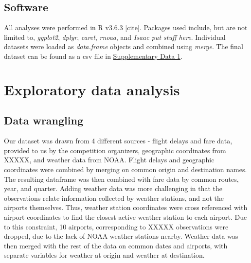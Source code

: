 \documentclass[12pt, a4paper]{book}
\newcommand\tab[1][1cm]{\hspace*{#1}}
\begin{document}
	\section{Software}
	\tab All analyses were performed in R v3.6.3 [cite]. Packages used include, but are not limited to, \textit{ggplot2}, \textit{dplyr}, \textit{caret}, \textit{rnoaa}, and \textit{Isaac put stuff here}. Individual datasets were loaded as \textit{data.frame} objects and combined using \textit{merge}. The final dataset can be found as a csv file in \underline{Supplementary Data 1}. 
	
\chapter{Exploratory data analysis}
	\section{Data wrangling}
	Our dataset was drawn from 4 different sources - flight delays and fare data, provided to us by the competition organizers, geographic coordinates from XXXXX, and weather data from NOAA. Flight delays and geographic coordinates were combined by merging on common  origin and destination names. The resulting dataframe was then combined with fare data by common routes, year, and quarter. Adding weather data was more challenging in that the observations relate information collected by weather stations, and not the airports themselves. Thus, weather station coordinates were cross referenced with airport coordinates to find the closest active weather station to each airport. Due to this constraint, 10 airports, corresponding to XXXXX observations were dropped, due to the lack of NOAA weather stations nearby. Weather data was then merged with the rest of the data on common dates and airports, with separate variables for weather at origin and weather at destination.  
\end{document}
